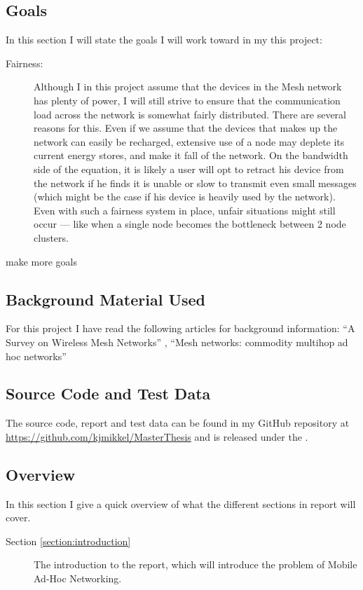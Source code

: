 \subsection{Goals}
In this section I will state the goals I will work toward in my this project:

\begin{description}
\item[Fairness:] Although I in this project assume that the devices in the Mesh network has plenty of power, I will still strive to ensure that the communication load across the network is somewhat fairly distributed. There are several reasons for this. Even if we assume that the devices that makes up the network can easily be recharged, extensive use of a node may deplete its current energy stores, and make it fall of the network. On the bandwidth side of the equation, it is likely a user will opt to retract his device from the network if he finds it is unable or slow to transmit even small messages (which might be the case if his device is heavily used by the network). Even with such a fairness system in place, unfair situations might still occur --- like when a single node becomes the bottleneck between 2 node clusters. 
\item[make more goals] 
\end{description}

\subsection{Background Material Used}
For this project I have read the following articles for background information: ``A Survey on Wireless Mesh Networks'' \cite{martinWirelessSurvey}, ``Mesh networks: commodity multihop ad hoc networks''\cite{martinMeshnetwork} 

\subsection{Source Code and Test Data}
The source code, report and test data can be found in my GitHub repository at \url{https://github.com/kjmikkel/MasterThesis} and is released under the .

\subsection{Overview}
In this section I give a quick overview of what the different sections in report will cover.
\begin{description}
\item[Section \ref{section:introduction}] The introduction to the report, which will introduce the problem of Mobile Ad-Hoc Networking.
\item[]
\end{description}
